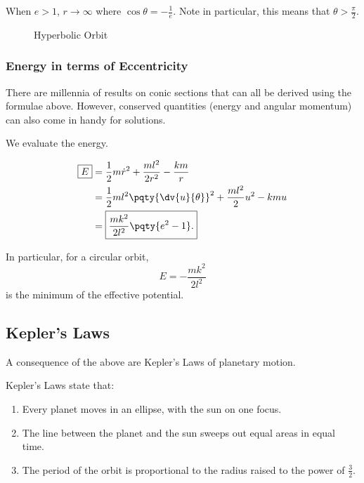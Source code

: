 When \(e > 1\), \(r \to \infty\) where \(\cos \theta = - \frac{1}{e}\). Note in particular, this means that \(\theta > \frac{\pi}{2}\).

\begin{figure}[ht!]
    \centering

    \caption{Hyperbolic Orbit}
    \label{fig:hyperbolic-orbit}%
\end{figure}

\subsubsection{Energy in terms of Eccentricity}

There are millennia of results on conic sections that can all be derived using the formulae above. However, conserved quantities (energy and angular momentum) can also come in handy for solutions.

We evaluate the energy.

\begin{subequations}\begin{align}
    \boxed{E} &= \frac{1}{2} m \dot{r}^2 + \frac{m l^2}{2 r^2} - \frac{km}{r} \\
    &= \frac{1}{2} m l^2 \pqty{\dv{u}{\theta}}^2 + \frac{m l^2}{2} u^2 - kmu \\
    &= \boxed{\frac{m k^2}{2l^2} \pqty{e^2 - 1}.}
\end{align}\end{subequations}

In particular, for a circular orbit,
\begin{equation}
    E = - \frac{m k^2}{2 l^2}
\end{equation}
is the minimum of the effective potential.

\subsection{Kepler's Laws}

A consequence of the above are Kepler's Laws of planetary motion.

\begin{theorem}
    \label{thm:kepler-laws}
    Kepler's Laws state that:
    \begin{enumerate}
        \item Every planet moves in an ellipse, with the sun on one focus.
        \item The line between the planet and the sun sweeps out equal areas in equal time.
        \item The period of the orbit is proportional to the radius raised to the power of \(\frac{3}{2}\).
    \end{enumerate}
\end{theorem}

